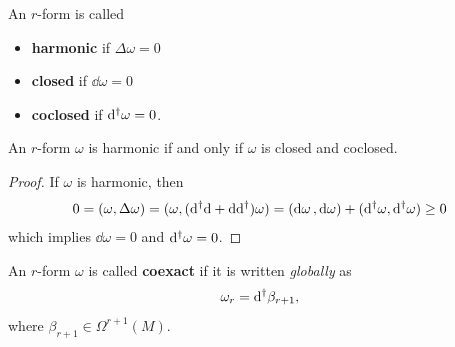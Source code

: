 \documentclass[10pt]{article}
\begin{document}
\begin{definition}
    An $r$-form is called
    \begin{itemize}
        \item \textbf{harmonic} if $\Delta\omega=0$
        \item \textbf{closed} if $\dd{\omega}=0$
        \item \textbf{coclosed} if $\mathrm{d}^\dagger\omega=0$.
    \end{itemize}
\end{definition}
\begin{theorem}\label{closedandcoclosed}
    An $r$-form $\omega$ is harmonic if and only if $\omega$ is closed and coclosed.
\end{theorem}
\begin{proof}
    If $\omega$ is harmonic, then
    \begin{align}
        0=(\omega,\Delta\omega)=(\omega,(\mathrm{d}^\dagger\mathrm{d}+\mathrm{d}\mathrm{d}^\dagger)\omega)=(\dd{\omega},\dd{\omega})+(\mathrm{d}^\dagger\omega,\mathrm{d}^\dagger\omega)\geq0
    \end{align}
    which implies $\dd{\omega}=0$ and $\mathrm{d}^\dagger\omega=0$.
\end{proof}
\begin{definition}
    An $r$-form $\omega$ is called \textbf{coexact} if it is written \textit{globally} as
    \begin{align}
        \omega_r=\mathrm{d}^\dagger\beta_{r+1},
    \end{align}
    where $\beta_{r+1}\in\Omega^{r+1}(M)$.
\end{definition}
\end{document}

